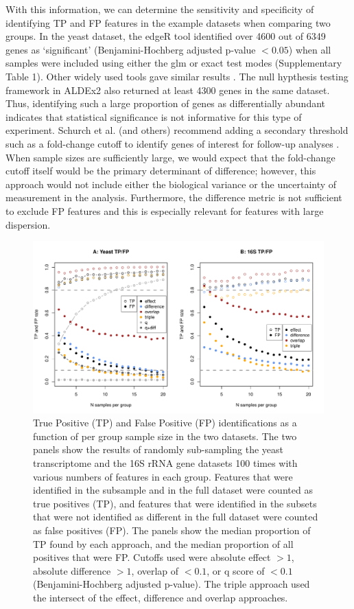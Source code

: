 \documentclass[fleqn,10pt,lineno]{wlpeerj}
\begin{document}
With this  information, we can  determine the sensitivity and specificity of identifying TP and FP features in the example datasets when comparing two groups. In the yeast dataset, the edgeR tool identified over 4600 out of 6349 genes as `significant'  (Benjamini-Hochberg adjusted p-value $< 0.05$) when all samples were included using either the glm or exact test modes (Supplementary Table 1).  Other widely used tools gave similar results \citep{Schurch:2016aa}. The null hypthesis testing framework in ALDEx2 also returned at least 4300 genes in the same dataset. Thus, identifying such a large proportion of genes as differentially abundant indicates that statistical significance is not informative for this type of experiment. Schurch et al. (and others) recommend adding a secondary threshold such as a fold-change cutoff to identify genes of interest for follow-up analyses \citep{Cui:2003aa,Schurch:2016aa}. When sample sizes are sufficiently large, we would expect that the fold-change cutoff itself would be the primary determinant of difference; however, this approach would not include either the biological variance or the uncertainty of measurement in the analysis. Furthermore,  the difference metric is not sufficient to exclude FP features and this is especially relevant for features with large dispersion.


\begin{figure}[tpb]
\centerline{\includegraphics[scale=0.4]{TPvsFP.pdf}}
\caption{True Positive (TP) and False Positive (FP) identifications as a function of per group sample size in the two datasets. The two  panels show the results of randomly sub-sampling the yeast transcriptome and the 16S rRNA gene  datasets 100 times with various numbers of features in each group.  Features that were identified in the subsample and in the full dataset were counted as true positives (TP), and features that were identified in the subsets that were not identified as different in the full dataset were counted as false positives (FP). The panels show the median proportion of TP found by each approach, and the median proportion of all positives that were FP.  Cutoffs used were absolute effect $> 1$, absolute difference $> 1$, overlap of $< 0.1$, or q score of $< 0.1$ (Benjamini-Hochberg adjusted p-value). The triple approach used the intersect of the effect, difference and overlap approaches. 
}
\label{fig:02}
\end{figure}
\end{document}
